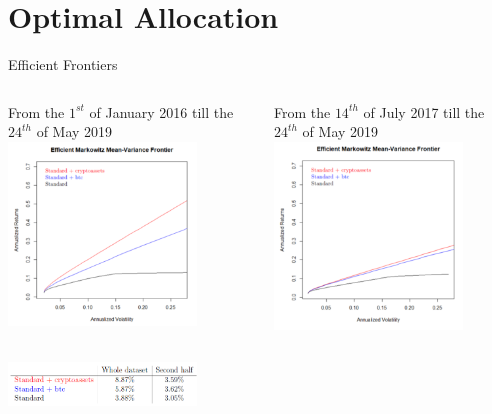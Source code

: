 \documentclass[c, 10pt]{beamer}
\newcommand\Fontvi{\fontsize{8}{7.2}\selectfont}
\begin{document}
\section{Optimal Allocation}
\begin{frame}{Efficient Frontiers}
	\begin{columns}
		\begin{column}{0.5\textwidth}
		    \Fontvi{} From the $1^{st}$ of January 2016 till the $24^{th}$ of May 2019
			\includegraphics[width=5cm]{Images/effwhole}
		\end{column}
		\begin{column}{0.5\textwidth}
		    \Fontvi{} From the $14^{th}$ of July 2017 till the $24^{th}$ of May 2019
			\includegraphics[width=5cm]{Images/effhalf}
		\end{column}
	\end{columns}
	\begin{center}
	    \includegraphics[width=5cm]{Images/sharpe.png}
	\end{center}
\end{frame}









\end{document}
